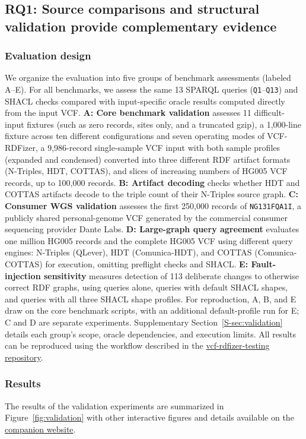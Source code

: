 \documentclass[pdflatex,sn-mathphys-num]{sn-jnl}
\begin{document}
\subsection{RQ1: Source comparisons and structural validation provide complementary evidence}\label{subsec:results-fidelity}
\subsubsection{Evaluation design}\label{subsec:eval-fidelity}
We organize the evaluation into five groups of benchmark assessments (labeled A--E).
For all benchmarks, we assess the same 13 SPARQL queries (\texttt{Q1}--\texttt{Q13}) and SHACL checks compared with input-specific oracle results computed directly from the input VCF.
\textbf{A: Core benchmark validation} assesses 11 difficult-input fixtures (such as zero records, sites only, and a truncated gzip), a 1,000-line fixture across ten different configurations and seven operating modes of VCF-RDFizer, a 9,986-record single-sample VCF input with both sample profiles (expanded and condensed) converted into three different RDF artifact formats (N-Triples, HDT, COTTAS), and slices of increasing numbers of HG005 VCF records, up to 100,000 records.
\textbf{B: Artifact decoding} checks whether HDT and COTTAS artifacts decode to the triple count of their N-Triples source graph.
\textbf{C: Consumer WGS validation} assesses the first 250,000 records of \texttt{NG131FQA1I}, a publicly shared personal-genome VCF generated by the commercial consumer sequencing provider Dante Labs.
\textbf{D: Large-graph query agreement} evaluates one million HG005 records and the complete HG005 VCF using different query engines: N-Triples (QLever), HDT (Comunica-HDT), and COTTAS (Comunica-COTTAS) for execution, omitting preflight checks and SHACL.
\textbf{E: Fault-injection sensitivity} measures detection of 113 deliberate changes to otherwise correct RDF graphs, using queries alone, queries with default SHACL shapes, and queries with all three SHACL shape profiles.
For reproduction, A, B, and E draw on the core benchmark scripts, with an additional default-profile run for E; C and D are separate experiments.
Supplementary Section~\ref{S-sec:validation} details each group's scope, oracle dependencies, and execution limits.
All results can be reproduced using the workflow described in the \href{https://github.com/ecrum19/vcf-rdfizer-testing#reproducing-the-results}{vcf-rdfizer-testing repository}.

\subsubsection{Results}\label{subsec:rq1-res}
The results of the validation experiments are summarized in Figure~\ref{fig:validation} with other interactive figures and details available on the \href{https://ecrum19.github.io/vcf-rdfizer-testing/#rq1}{companion website}.
\end{document}
